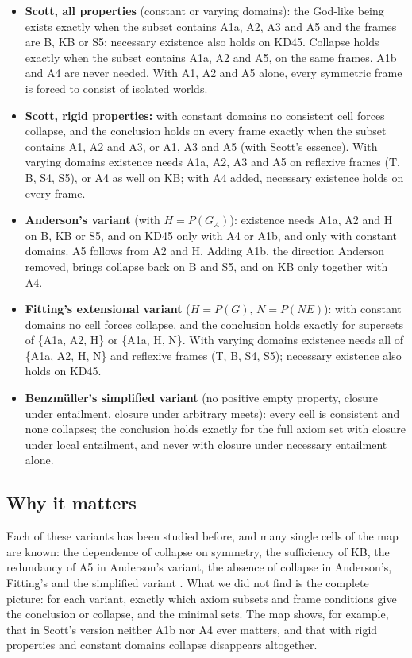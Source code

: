 \documentclass{article}
\begin{document}
\begin{itemize}
\item \textbf{Scott, all properties} (constant or varying domains): the God-like being exists exactly when the subset contains A1a, A2, A3 and A5 and the frames are B, KB or S5; necessary existence also holds on KD45. Collapse holds exactly when the subset contains A1a, A2 and A5, on the same frames. A1b and A4 are never needed. With A1, A2 and A5 alone, every symmetric frame is forced to consist of isolated worlds.
\item \textbf{Scott, rigid properties:} with constant domains no consistent cell forces collapse, and the conclusion holds on every frame exactly when the subset contains A1, A2 and A3, or A1, A3 and A5 (with Scott's essence). With varying domains existence needs A1a, A2, A3 and A5 on reflexive frames (T, B, S4, S5), or A4 as well on KB; with A4 added, necessary existence holds on every frame.
\item \textbf{Anderson's variant} (with $H = P(G_A)$): existence needs A1a, A2 and H on B, KB or S5, and on KD45 only with A4 or A1b, and only with constant domains. A5 follows from A2 and H. Adding A1b, the direction Anderson removed, brings collapse back on B and S5, and on KB only together with A4.
\item \textbf{Fitting's extensional variant} ($H = P(G)$, $N = P(NE)$): with constant domains no cell forces collapse, and the conclusion holds exactly for supersets of \{A1a, A2, H\} or \{A1a, H, N\}. With varying domains existence needs all of \{A1a, A2, H, N\} and reflexive frames (T, B, S4, S5); necessary existence also holds on KD45.
\item \textbf{Benzmüller's simplified variant} (no positive empty property, closure under entailment, closure under arbitrary meets): every cell is consistent and none collapses; the conclusion holds exactly for the full axiom set with closure under local entailment, and never with closure under necessary entailment alone.
\end{itemize}

\subsection*{Why it matters}

Each of these variants has been studied before, and many single cells of the map are known: the
dependence of collapse on symmetry, the sufficiency of KB, the redundancy of A5 in Anderson's
variant, the absence of collapse in Anderson's, Fitting's and the simplified variant
\cite{benzmueller2025notes,benzmueller2026lean,benzmueller2017hajek,benzmueller2020simplified}.
What we did not find is the complete picture: for each variant, exactly which axiom subsets and
frame conditions give the conclusion or collapse, and the minimal sets. The map shows, for
example, that in Scott's version neither A1b nor A4 ever matters, and that with rigid
properties and constant domains collapse disappears altogether.
\end{document}
